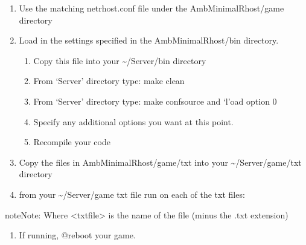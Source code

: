\documentclass[letterpaper,10pt,english]{sphinxmanual}
\begin{document}
\begin{enumerate}
%
\item {} 
\sphinxAtStartPar
Use the matching netrhost.conf file under the Amb\sphinxhyphen{}MinimalRhost/game directory

\item {} 
\sphinxAtStartPar
Load in the settings specified in the Amb\sphinxhyphen{}MinimalRhost/bin directory.
\begin{enumerate}
%
\item {} 
\sphinxAtStartPar
Copy this file into your \textasciitilde{}/Server/bin directory

\item {} 
\sphinxAtStartPar
From ‘Server’ directory type: make clean

\item {} 
\sphinxAtStartPar
From ‘Server’ directory type: make confsource and ‘l’oad option 0

\item {} 
\sphinxAtStartPar
Specify any \sphinxhyphen{}additional\sphinxhyphen{} options you want at this point.

\item {} 
\sphinxAtStartPar
Recompile your code

\end{enumerate}

\item {} 
\sphinxAtStartPar
Copy the files in Amb\sphinxhyphen{}MinimalRhost/game/txt into your \textasciitilde{}/Server/game/txt directory

\item {} 
\sphinxAtStartPar
from your \textasciitilde{}/Server/game txt file run on each of the txt files:

\begin{sphinxVerbatim}[commandchars=\\\{\}]
  
\end{sphinxVerbatim}

\end{enumerate}

\begin{sphinxadmonition}{note}{Note:}
\sphinxAtStartPar
Where \textless{}txtfile\textgreater{} is the name of the file (minus the .txt extension)
\end{sphinxadmonition}
\begin{enumerate}
%
\item {} 
\sphinxAtStartPar
If running, @reboot your game.

\end{enumerate}
\end{document}
